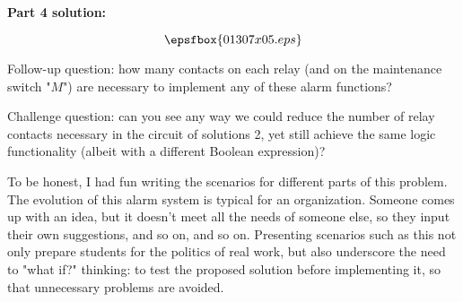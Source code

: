 \vskip 10pt

{\bf Part 4 solution:}

$$\epsfbox{01307x05.eps}$$

\vskip 10pt

Follow-up question: how many contacts on each relay (and on the maintenance switch "$M$") are necessary to implement any of these alarm functions?

\vskip 10pt

Challenge question: can you see any way we could reduce the number of relay contacts necessary in the circuit of solutions 2, yet still achieve the same logic functionality (albeit with a different Boolean expression)?







To be honest, I had fun writing the scenarios for different parts of this problem.  The evolution of this alarm system is typical for an organization.  Someone comes up with an idea, but it doesn't meet all the needs of someone else, so they input their own suggestions, and so on, and so on.  Presenting scenarios such as this not only prepare students for the politics of real work, but also underscore the need to "what if?" thinking: to test the proposed solution before implementing it, so that unnecessary problems are avoided.




